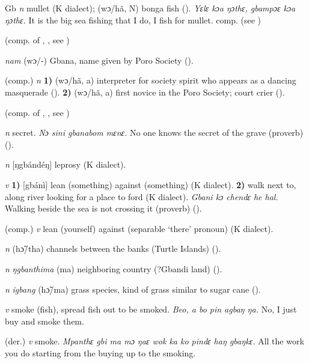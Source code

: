 \begin{letter}{Gb}
 \textit{n} mullet (K dialect); (wɔ/hã, N) bonga fish (\citealt{Pichl1967}). \textit{Yɛlɛ kɔa ŋɔthɛ, gbampɔɛ kɔa ŋɔthɛ.} It is the big sea fishing that I do, I fish for mullet. comp.  (see ) 

 (comp. of , , see ) 

 \textit{nam} (wɔ/-) Gbana, name given by Poro Society (\citealt{Pichl1967}). 

 (comp.) \textit{n} \textbf{1)} (wɔ/hã, a) interpreter for society spirit who appears as a dancing masquerade (\citealt{Pichl1967}). \textbf{2)} (wɔ/hã, a) first novice in the Poro Society; court crier (\citealt{Pichl1967}). 

 (comp. of , , see ) 

 \textit{n} secret. \textit{Nɔ sini gbanabom mɛnɛ.} No one knows the secret of the grave (proverb) (\citealt{TISLL1979}). 

 \textit{n} [ŋgbándéŋ] leprosy (K dialect). 

 \textit{v} \textbf{1)} [gbánì] lean (something) against (something) (K dialect). \textbf{2)} walk next to, along river looking for a place to ford (K dialect). \textit{Gbani kɔ chendɛ he hal.} Walking beside the sea is not crossing it (proverb) (\citealt{TISLL1979}). 

 (comp.) \textit{v} lean (yourself) against (separable ‘there' pronoun) (K dialect).

 \textit{n} (hɔ̃/tha) channels between the banks (Turtle Islands) (\citealt{Pichl1967}). 

 \textit{n} \textit{ŋgbanthima} (ma) neighboring country (?Gbandi land) (\citealt{Pichl1967}).

 \textit{n} \textit{igbang} (hɔ̃/ma) grass species, kind of grass similar to sugar cane (\citealt{Pichl1967}). 

 \textit{v} smoke (fish), spread fish out to be smoked. \textit{Beo, a bo pin agbaŋ ŋa.} No, I just buy and smoke them.

 (der.) \textit{v} smoke. \textit{Mpanthɛ gbi ma mɔ ŋaɛ wok ka ko pindɛ haŋ gbaŋkɛ.} All the work you do starting from the buying up to the smoking. 


\end{letter}
